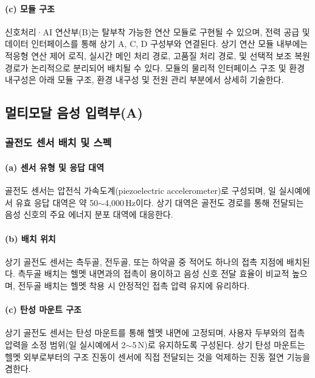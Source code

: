 \documentclass{article}
\begin{document}
\paragraph{(c) 모듈 구조}

신호처리·AI 연산부(B)는 탈부착 가능한 연산 모듈로 구현될 수 있으며, 전력 공급 및 데이터 인터페이스를 통해 상기 A, C, D 구성부와 연결된다. 상기 연산 모듈 내부에는 적응형 연산 제어 로직, 실시간 메인 처리 경로, 고품질 처리 경로, 및 선택적 보조 복원 경로가 논리적으로 분리되어 배치될 수 있다. 모듈의 물리적 인터페이스 구조 및 환경 내구성은 아래 모듈 구조, 환경 내구성 및 전원 관리 부분에서 상세히 기술한다.

\subsection{멀티모달 음성 입력부(A)}

\subsubsection{골전도 센서 배치 및 스펙}

\paragraph{(a) 센서 유형 및 응답 대역}

골전도 센서는 압전식 가속도계(piezoelectric accelerometer)로 구성되며, 일 실시예에서 유효 응답 대역은 약 50$\sim$4{,}000\,Hz이다. 상기 대역은 골전도 경로를 통해 전달되는 음성 신호의 주요 에너지 분포 대역에 대응한다.

\paragraph{(b) 배치 위치}

상기 골전도 센서는 측두골, 전두골, 또는 하악골 중 적어도 하나의 접촉 지점에 배치된다. 측두골 배치는 헬멧 내면과의 접촉이 용이하고 음성 신호 전달 효율이 비교적 높으며, 전두골 배치는 헬멧 착용 시 안정적인 접촉 압력 유지에 유리하다.

\paragraph{(c) 탄성 마운트 구조}

상기 골전도 센서는 탄성 마운트를 통해 헬멧 내면에 고정되며, 사용자 두부와의 접촉 압력을 소정 범위(일 실시예에서 2$\sim$5\,N)로 유지하도록 구성된다. 상기 탄성 마운트는 헬멧 외부로부터의 구조 진동이 센서에 직접 전달되는 것을 억제하는 진동 절연 기능을 겸한다.
\end{document}
